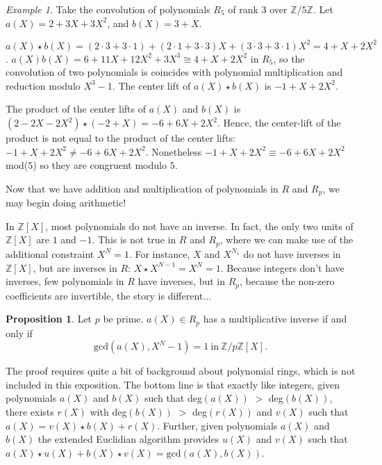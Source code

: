 \documentclass[12pt]{article}
\theoremstyle{definition}
\theoremstyle{proposition}
\newtheorem{proposition}{Proposition}[section]
\theoremstyle{remark}
\theoremstyle{theorem}
\theoremstyle{example}
\newtheorem{example}{Example}[section]
\newcommand{\Z}{\mathbb{Z}}
\begin{document}
\begin{example}
    Take the convolution of polynomials $R_5$ of rank $3$ over $\Z/5\Z$. Let $a(X) = 2 + 3X + 3X^2$, and $b(X) = 3 + X$.

    $a(X) \star b(X) = (2\cdot 3 + 3 \cdot 1) + (2 \cdot 1 + 3 \cdot 3)X + (3 \cdot 3 + 3 \cdot 1)X^2 = 4 + X + 2X^2$. $a(X)b(X) = 6 + 11X + 12X^2 + 3X^3 \cong 4 + X + 2X^2$ in $R_5$, so the convolution of two polynomials is coincides with polynomial multiplication and reduction modulo $X^3-1$. The center lift of $a(X) \star b(X)$ is $-1 + X + 2X^2$.

    The product of the center lifts of $a(X)$ and $b(X)$ is $(2 - 2X -2X^2)\star (-2 + X) =  -6 + 6X + 2 X^2$. Hence, the center-lift of the product is not equal to the product of the center lifts: $-1 + X + 2X^2 \not = -6 + 6X + 2 X^2$. Nonetheless $-1 + X + 2X^2 \equiv -6 + 6X + 2 X^2$ mod($5$) so they are congruent modulo $5$.
\end{example}


Now that we have addition and multiplication of polynomials in $R$ and $R_p$, we may begin doing arithmetic!

In $\Z[X]$, most polynomials do not have an inverse. In fact, the only two units of $\Z[X]$ are $1$ and $-1$. This is not true in $R$ and $R_p$, where we can make use of the additional constraint $X^N = 1$. For instance, $X$ and $X^{N_1}$ do not have inverses in $\Z[X]$, but are inverses in $R$:  $X \star X^{N-1} = X^{N} = 1$. Because integers don't have inverses, few polynomials in $R$ have inverses, but in $R_p$, because the non-zero coefficients are invertible, the story is different...

\begin{proposition}
    Let $p$ be prime. $a(X) \in R_p$ has a multiplicative inverse if and only if $$\mathrm{gcd}(a(X), X^N-1) = 1 \: \mathrm{ in } \:  \Z/p\Z[X].$$
\end{proposition}

The proof requires quite a bit of background about polynomial rings, which is not included in this exposition. The bottom line is that exactly like integers, given polynomials $a(X)$ and $b(X)$ such that deg$(a(X))$ $>$ deg$(b(X))$, there exists $r(X)$ with deg$(b(X))$ $>$ deg$(r(X))$ and $v(X)$ such that $a(X) = v(X) \star b(X) + r(X)$. Further, given polynomials $a(X)$ and $b(X)$ the extended Euclidian algorithm provides $u(X)$ and $v(X)$ such that $a(X) \star u(X) + b(X) \star v(X) = \mathrm{gcd}(a(X),b(X))$.
\end{document}
